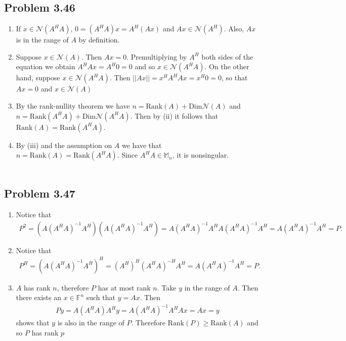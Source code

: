 \documentclass[letterpaper,12pt]{article}
\theoremstyle{definition}
\begin{document}
\begin{spacing}{1.3}{}
\subsection*{Problem 3.46}
\begin{enumerate}
    \item 	If $x\in\mathcal N(A^HA)$, $0=(A^HA)x=A^H(Ax)$ and $Ax\in\mathcal N(A^H)$.
	Also, $Ax$ is in the range of $A$ by definition.

\item
Suppose $x\in\mathcal N(A)$.
	Then $Ax=0$.
	Premultiplying by $A^H$ both sides of the equation we obtain $A^HAx=A^H0=0$
	and so $x\in\mathcal N(A^HA)$.
	On the other hand, suppose $x\in\mathcal N(A^HA)$.
	Then $||Ax||=x^HA^HAx=x^H0=0$, so that $Ax=0$ and $x\in\mathcal N(A)$
\item
	By the rank-nullity theorem we have $n=\text{Rank}(A)+\text{Dim}\mathcal N(A)$
	and $n=\text{Rank}(A^HA)+\text{Dim}\mathcal N(A^HA)$.
	Then by (ii) it follows that $\text{Rank}(A)=\text{Rank}(A^HA)$.
	\item
		By (iii) and the assumption on $A$ we have that $n=\text{Rank}(A)=\text{Rank}(A^HA)$.
	Since $A^HA\in\mathbb M_n$, it is nonsingular.\\\\

\end{enumerate}
\subsection*{Problem 3.47}
\begin{enumerate}
    \item 
    	Notice that
	\begin{align*}
	P^2=(A(A^HA)^{-1}A^H)(A(A^HA)^{-1}A^H)=
	A(A^HA)^{-1}A^HA(A^HA)^{-1}A^H=
	A(A^HA)^{-1}A^H=P.
	\end{align*}
	\item
		Notice that
	\begin{align*}
	P^H=(A(A^HA)^{-1}A^H)^H=
	(A^H)^H(A^HA)^{-H}A^H=A(A^HA)^{-1}A^H=P.
	\end{align*}
	\item
    $A$ has rank $n$, therefore $P$ has at most rank $n$.
	Take $y$ in the range of $A$.
	Then there exists an $x\in\mathbb F^n$ such that $y=Ax$.
	Then
	\begin{align*}
	Py=A(A^HA)A^Hy=A(A^HA)^{-1}A^HAx=Ax=y
	\end{align*}
	shows that $y$ is also in the range of $P$.
	Therefore $\text{Rank}(P)\geq\text{Rank}(A)$ and so $P$ has rank $p$ \\
\end{enumerate}


\end{spacing}
\end{document}
